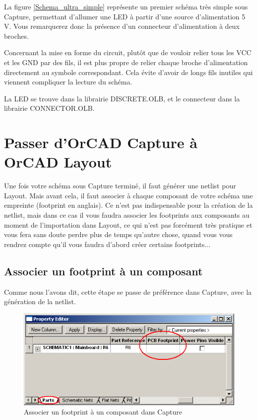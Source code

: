 \documentclass[a4paper]{article}
\begin{document}
La figure \ref{Schema_ultra_simple} représente un premier schéma très simple sous Capture, permettant d'allumer une \ac{LED} à partir d'une source d'alimentation 5 V. Vous remarquerez donc la présence d'un connecteur d'alimentation à deux broches.

Concernant la mise en forme du circuit, plutôt que de vouloir relier tous les VCC et les GND par des fils, il est plus propre de relier chaque broche d'alimentation directement au symbole correspondant. Cela évite d'avoir de longs fils inutiles qui viennent compliquer la lecture du schéma.

La \ac{LED} se trouve dans la librairie {\ttfamily DISCRETE.OLB}, et le connecteur dans la librairie {\ttfamily CONNECTOR.OLB}.

\section{Passer d'OrCAD Capture à OrCAD Layout}

Une fois votre schéma sous Capture terminé, il faut générer une netlist pour Layout. Mais avant cela, il faut associer à chaque composant de votre schéma une empreinte (footprint en anglais). Ce n'est pas indispensable pour la création de la netlist, mais dans ce cas il vous faudra associer les footprints aux composants au moment de l'importation dans Layout, ce qui n'est pas forcément très pratique et vous fera sans doute perdre plus de temps qu'autre chose, quand vous vous rendrez compte qu'il vous faudra d'abord créer certains footprints...

\subsection{Associer un footprint à un composant}

Comme nous l'avons dit, cette étape se passe de préférence dans Capture, avec la génération de la netlist.

\begin{figure}[H]
	\centering
	\includegraphics[scale=0.75]{Images/Associer_footprint_composant.png}
	\caption{Associer un footprint à un composant dans Capture
		\label{Associer_footprint_composant}}
\end{figure}
\end{document}
